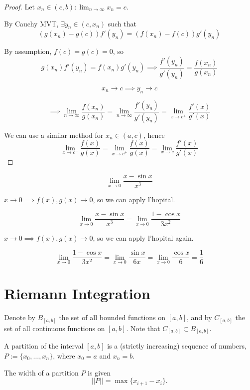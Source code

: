 \documentclass[a4paper,10pt]{article}
\begin{document}
\begin{proof}
	Let $x_n \in (c,b) : \lim_{n \to \infty} x_n = c$.

	By Cauchy MVT, $\exists y_n \in (c, x_n)$ such that
	\[ (g(x_n) - g(c))f'(y_n) = (f(x_n) - f(c))g'(y_n) \]

	By assumption, $f(c) = g(c) = 0$, so
	\[
		g(x_n)f'(y_n) = f(x_n)g'(y_n)
		\implies
		\frac{f'(y_n)}{g'(y_n)} = \frac{f(x_n)}{g(x_n)}
	\]

	\[ x_n \to c \implies y_n \to c \]

	\[
		\implies
		\lim_{n \to \infty}\frac{f(x_n)}{g(x_n)}
		= \lim_{n \to \infty}\frac{f'(y_n)}{g'(y_n)}
		= \lim_{x \to c^+}\frac{f'(x)}{g'(x)}
	\]

	We can use a similar method for $x_n \in (a,c)$, hence
	\[
		\lim_{x \to c^-}\frac{f(x)}{g(x)}
		= \lim_{x \to c^+}\frac{f(x)}{g(x)}
		= \lim_{x \to c}\frac{f'(x)}{g'(x)}
	\]
\end{proof}

\begin{ex}
	\[ \lim_{x \to 0} \frac{x - \sin x}{x^3} \]

	$x \to 0 \implies f(x), g(x) \to 0$, so we can apply l'hopital.

	\[
		\lim_{x \to 0} \frac{x - \sin x}{x^3}
		= \lim_{x \to 0} \frac{1 - \cos x}{3x^2}
	\]

	$x \to 0 \implies f(x), g(x) \to 0$, so we can apply l'hopital again.

	\[
		\lim_{x \to 0} \frac{1 - \cos x}{3x^2}
		= \lim_{x \to 0} \frac{\sin x}{6x}
		= \lim_{x \to 0} \frac{\cos x}{6}
		= \frac{1}{6}
	\]

\end{ex}

\section{Riemann Integration}

Denote by $B_{[a,b]}$ the set of all bounded functions on $[a,b]$, and
by $C_{[a,b]}$ the set of all continuous functions on $[a,b]$. Note that
$C_{[a,b]} \subset B_{[a,b]}$.

\begin{defn}[Partition]
	A partition of the interval $[a,b]$ is a (strictly increasing)
	sequence of numbers, $P := \{x_0, \ldots, x_n\}$, where $x_0 = a$
	and $x_n = b$.
\end{defn}

\begin{defn}
	The width of a partition $P$ is given
	\[ ||P|| = \max\{x_{i+1} - x_i\}.\]
\end{defn}
\end{document}

